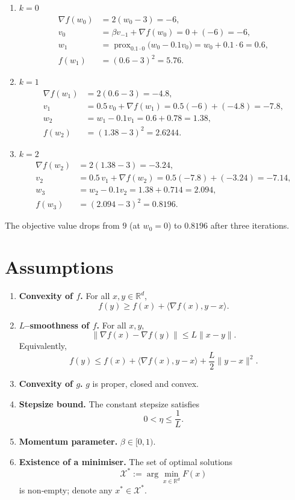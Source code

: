 \documentclass{article}
\newcommand{\prox}{\operatorname{prox}}
\begin{document}
\begin{enumerate}[label=Iteration \arabic*:, leftmargin=*]
\item $k=0$  
\[
\begin{aligned}
\nabla f(w_{0}) &= 2(w_{0}-3)= -6,\\
v_{0} &= \beta v_{-1}+ \nabla f(w_{0}) = 0+(-6)=-6,\\
w_{1} &= \prox_{0.1\cdot0}\bigl(w_{0}-0.1 v_{0}\bigr)
      = w_{0}+0.1\cdot6 = 0.6,\\
f(w_{1}) &= (0.6-3)^{2}=5.76 .
\end{aligned}
\]

\item $k=1$  
\[
\begin{aligned}
\nabla f(w_{1}) &= 2(0.6-3)= -4.8,\\
v_{1} &= 0.5\,v_{0}+ \nabla f(w_{1}) = 0.5(-6)+(-4.8)= -7.8,\\
w_{2} &= w_{1}-0.1 v_{1}=0.6+0.78=1.38,\\
f(w_{2}) &= (1.38-3)^{2}=2.6244 .
\end{aligned}
\]

\item $k=2$  
\[
\begin{aligned}
\nabla f(w_{2}) &= 2(1.38-3)= -3.24,\\
v_{2} &= 0.5\,v_{1}+ \nabla f(w_{2}) =0.5(-7.8)+(-3.24)= -7.14,\\
w_{3} &= w_{2}-0.1 v_{2}=1.38+0.714=2.094,\\
f(w_{3}) &= (2.094-3)^{2}=0.8196 .
\end{aligned}
\]
\end{enumerate}
The objective value drops from $9$ (at $w_{0}=0$) to $0.8196$ after three iterations.

\newpage
\section*{Assumptions}
\begin{enumerate}[label=\textbf{A\arabic*:}, leftmargin=*]
\item \label{A1} \textbf{Convexity of $f$.} For all $x,y\in\mathbb{R}^{d}$,
\[
f(y)\ge f(x)+\langle\nabla f(x),y-x\rangle .
\]
\item \label{A2} \textbf{$L$–smoothness of $f$.} For all $x,y$,
\[
\|\nabla f(x)-\nabla f(y)\|\le L\|x-y\| .
\]
Equivalently,
\[
f(y)\le f(x)+\langle\nabla f(x),y-x\rangle+\frac{L}{2}\|y-x\|^{2}.
\]
\item \label{A3} \textbf{Convexity of $g$.} $g$ is proper, closed and convex.
\item \label{A4} \textbf{Stepsize bound.} The constant stepsize satisfies
\[
0<\eta\le \frac{1}{L}.
\]
\item \label{A5} \textbf{Momentum parameter.} $\beta\in[0,1)$.
\item \label{A6} \textbf{Existence of a minimiser.} The set of optimal solutions
\[
\mathcal{X}^{*}:=\arg\min_{x\in\mathbb{R}^{d}}F(x)
\]
is non‑empty; denote any $x^{*}\in\mathcal{X}^{*}$.
\end{enumerate}
\end{document}
